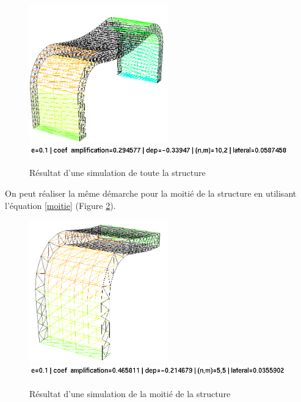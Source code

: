 \begin{solution}
    \begin{figure}        
        \begin{center}
        
            \includegraphics[width=6cm]{imgs/all_simu.PNG}
            \includegraphics[width=12cm]{imgs/all_simu_label.PNG}
            \caption{Résultat d'une simulation de toute la structure}
            \label{fig:simu_def}
        
        \end{center}
    \end{figure}

    On peut réaliser la même démarche pour la moitié de la structure en utilisant l'équation \ref{moitie} (Figure \ref{fig:simu_def_moitie}).

    \begin{figure}        
        \begin{center}
        
            \includegraphics[width=6cm]{imgs/half_simu.PNG}
            \includegraphics[width=12cm ]{imgs/half_simu_label.PNG}
            \caption{Résultat d'une simulation de la moitié de la structure}
            \label{fig:simu_def_moitie}
        
        \end{center}
    \end{figure}

\end{solution}

